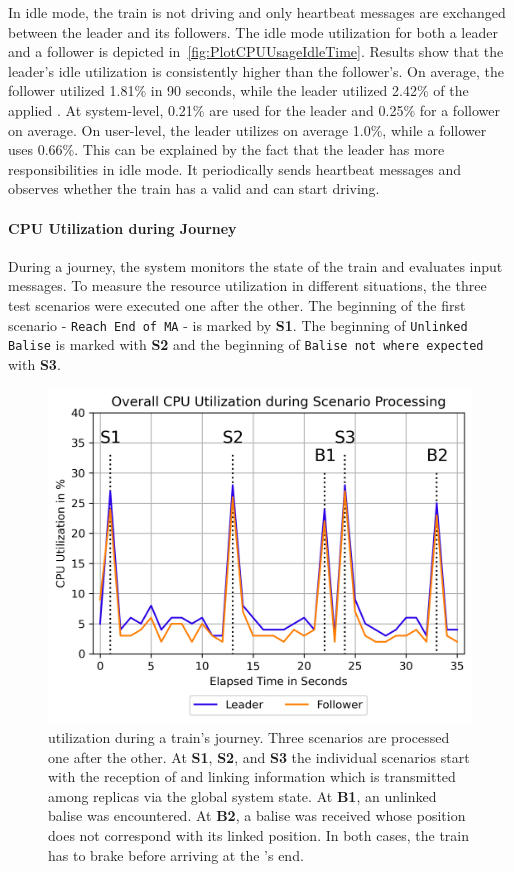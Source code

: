 In idle mode, the train is not driving and only heartbeat messages are exchanged between the leader and its followers.
The idle mode  utilization for both a leader and a follower is depicted in~\autoref{fig:PlotCPUUsageIdleTime}.
Results show that the leader's idle  utilization is consistently higher than the follower's.
On average, the follower utilized 1.81\% in 90 seconds, while the leader utilized 2.42\% of the applied .
At system-level, 0.21\% are used for the leader and 0.25\% for a follower on average.
On user-level, the leader utilizes on average 1.0\%, while a follower uses 0.66\%.
This can be explained by the fact that the leader has more responsibilities in idle mode.
It periodically sends heartbeat messages and observes whether the train has a valid  and can start driving.


\paragraph{CPU Utilization during Journey}

During a journey, the system monitors the state of the train and evaluates input messages.
To measure the resource utilization in different situations, the three test scenarios were executed one after the other.
The beginning of the first scenario - \texttt{Reach End of MA} - is marked by \textbf{S1}.
The beginning of \texttt{Unlinked Balise} is marked with \textbf{S2} and the beginning of \texttt{Balise not where expected} with \textbf{S3}.

\begin{figure}[!htb]
	\centering
	\includegraphics[width=0.8\linewidth]{images/plots/TotalCPUUsage}
	\caption{ utilization during a train's journey. Three scenarios are processed one after the other. At \textbf{S1}, \textbf{S2}, and \textbf{S3} the individual scenarios start with the reception of  and linking information which is transmitted among replicas via the global system state. At \textbf{B1}, an unlinked balise was encountered. At \textbf{B2}, a balise was received whose position does not correspond with its linked position. In both cases, the train has to brake before arriving at the 's end.}
	\label{fig:PlotTotalCPUUsage}
\end{figure}

